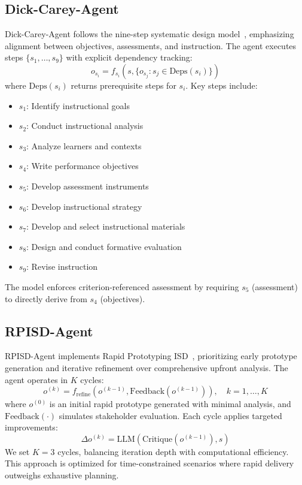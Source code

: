 \subsection{Dick-Carey-Agent}
\label{subsec:dick-carey-agent}

Dick-Carey-Agent follows the nine-step systematic design model~\cite{dick1978systematic}, emphasizing alignment between objectives, assessments, and instruction. The agent executes steps $\{s_1, \ldots, s_9\}$ with explicit dependency tracking:
\begin{equation}
o_{s_i} = f_{s_i}(s, \{o_{s_j} : s_j \in \text{Deps}(s_i)\})
\end{equation}
where $\text{Deps}(s_i)$ returns prerequisite steps for $s_i$. Key steps include:
\begin{itemize}
    \item $s_1$: Identify instructional goals
    \item $s_2$: Conduct instructional analysis
    \item $s_3$: Analyze learners and contexts
    \item $s_4$: Write performance objectives
    \item $s_5$: Develop assessment instruments
    \item $s_6$: Develop instructional strategy
    \item $s_7$: Develop and select instructional materials
    \item $s_8$: Design and conduct formative evaluation
    \item $s_9$: Revise instruction
\end{itemize}
The model enforces criterion-referenced assessment by requiring $s_5$ (assessment) to directly derive from $s_4$ (objectives).

\subsection{RPISD-Agent}
\label{subsec:rpisd-agent}

RPISD-Agent implements Rapid Prototyping ISD~\cite{tripp1990rapid}, prioritizing early prototype generation and iterative refinement over comprehensive upfront analysis. The agent operates in $K$ cycles:
\begin{equation}
o^{(k)} = f_{\text{refine}}(o^{(k-1)}, \text{Feedback}(o^{(k-1)})), \quad k = 1, \ldots, K
\end{equation}
where $o^{(0)}$ is an initial rapid prototype generated with minimal analysis, and $\text{Feedback}(\cdot)$ simulates stakeholder evaluation. Each cycle applies targeted improvements:
\begin{equation}
\Delta o^{(k)} = \text{LLM}(\text{Critique}(o^{(k-1)}), s)
\end{equation}
We set $K=3$ cycles, balancing iteration depth with computational efficiency. This approach is optimized for time-constrained scenarios where rapid delivery outweighs exhaustive planning.

